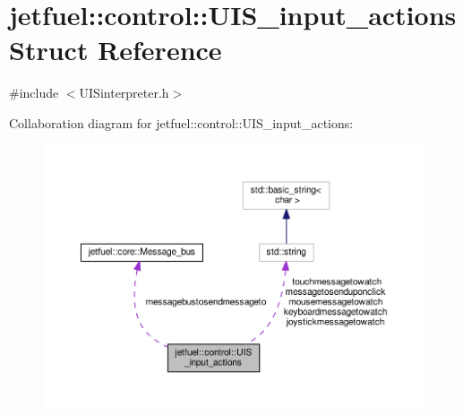 \hypertarget{structjetfuel_1_1control_1_1UIS__input__actions}{}\section{jetfuel\+:\+:control\+:\+:U\+I\+S\+\_\+input\+\_\+actions Struct Reference}
\label{structjetfuel_1_1control_1_1UIS__input__actions}


{\ttfamily \#include $<$U\+I\+Sinterpreter.\+h$>$}



Collaboration diagram for jetfuel\+:\+:control\+:\+:U\+I\+S\+\_\+input\+\_\+actions\+:\nopagebreak
\begin{figure}[H]
\begin{center}
\leavevmode
\includegraphics[width=350pt]{structjetfuel_1_1control_1_1UIS__input__actions__coll__graph}
\end{center}
\end{figure}
